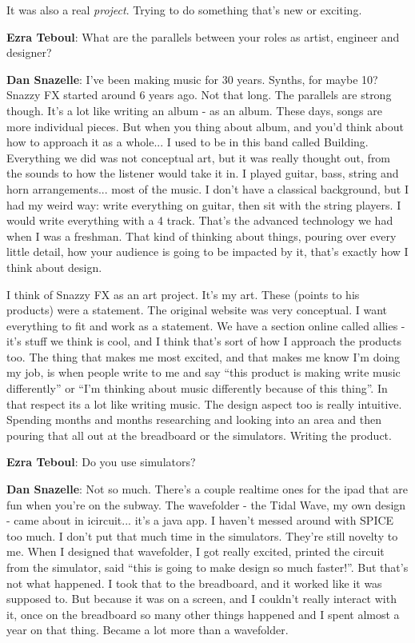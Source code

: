 It was also a real \emph{project}. Trying to do something that's new or exciting. 

\textbf{Ezra Teboul}: What are the parallels between your roles as artist, engineer and designer? 

\textbf{Dan Snazelle}: I've been making music for 30 years. Synths, for maybe 10? Snazzy FX started around 6 years ago. Not that long. The parallels are strong though. It's a lot like writing an album - as an album. These days, songs are more individual pieces. But when you thing about album, and you'd think about how to approach it as a whole... I used to be in this band called Building. Everything we did was not conceptual art, but it was really thought out, from the sounds to how the listener would take it in. I played guitar, bass, string and horn arrangements... most of the music. I don't have a classical background, but I had my weird way: write everything on guitar, then sit with the string players. I would write everything with a 4 track. That's the advanced technology we had when I was a freshman. That kind of thinking about things, pouring over every little detail, how your audience is going to be impacted by it, that's exactly how I think about design. 

I think of Snazzy FX as an art project. It's my art. These (points to his products) were a statement. The original website was very conceptual. I want everything to fit and work as a statement. We have a section online called allies - it's stuff we think is cool, and I think that's sort of how I approach the products too. The thing that makes me most excited, and that makes me know I'm doing my job, is when people write to me and say ``this product is making write music differently'' or ``I'm thinking about music differently because of this thing''. In that respect its a lot like writing music. The design aspect too is really intuitive. Spending months and months researching and looking into an area and then pouring that all out at the breadboard or the simulators. Writing the product. 

\textbf{Ezra Teboul}: Do you use simulators? 

\textbf{Dan Snazelle}: Not so much. There's a couple realtime ones for the ipad that are fun when you're on the subway. The wavefolder - the Tidal Wave, my own design - came about in icircuit... it's a java app. I haven't messed around with SPICE too much. I don't put that much time in the simulators. They're still novelty to me. When I designed that wavefolder, I got really excited, printed the circuit from the simulator, said ``this is going to make design so much faster!''. But that's not what happened. I took that to the breadboard, and it worked like it was supposed to. But because it was on a screen, and I couldn't really interact with it, once on the breadboard so many other things happened and I spent almost a year on that thing. Became a lot more than a wavefolder. 


